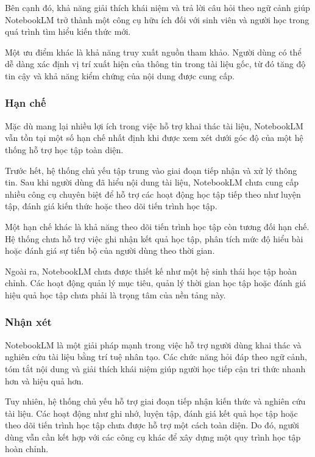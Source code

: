 Bên cạnh đó, khả năng giải thích khái niệm và trả lời câu hỏi theo ngữ cảnh giúp NotebookLM trở thành một công cụ hữu ích đối với sinh viên và người học trong quá trình tìm hiểu kiến thức mới.

Một ưu điểm khác là khả năng truy xuất nguồn tham khảo. Người dùng có thể dễ dàng xác định vị trí xuất hiện của thông tin trong tài liệu gốc, từ đó tăng độ tin cậy và khả năng kiểm chứng của nội dung được cung cấp.

\subsubsection{Hạn chế}

Mặc dù mang lại nhiều lợi ích trong việc hỗ trợ khai thác tài liệu, NotebookLM vẫn tồn tại một số hạn chế nhất định khi được xem xét dưới góc độ của một hệ thống hỗ trợ học tập toàn diện.

Trước hết, hệ thống chủ yếu tập trung vào giai đoạn tiếp nhận và xử lý thông tin. Sau khi người dùng đã hiểu nội dung tài liệu, NotebookLM chưa cung cấp nhiều công cụ chuyên biệt để hỗ trợ các hoạt động học tập tiếp theo như luyện tập, đánh giá kiến thức hoặc theo dõi tiến trình học tập.

Một hạn chế khác là khả năng theo dõi tiến trình học tập còn tương đối hạn chế. Hệ thống chưa hỗ trợ việc ghi nhận kết quả học tập, phân tích mức độ hiểu bài hoặc đánh giá sự tiến bộ của người dùng theo thời gian.

Ngoài ra, NotebookLM chưa được thiết kế như một hệ sinh thái học tập hoàn chỉnh. Các hoạt động quản lý mục tiêu, quản lý thời gian học tập hoặc đánh giá hiệu quả học tập chưa phải là trọng tâm của nền tảng này.

\subsubsection{Nhận xét}

NotebookLM là một giải pháp mạnh trong việc hỗ trợ người dùng khai thác và nghiên cứu tài liệu bằng trí tuệ nhân tạo. Các chức năng hỏi đáp theo ngữ cảnh, tóm tắt nội dung và giải thích khái niệm giúp người học tiếp cận tri thức nhanh hơn và hiệu quả hơn.

Tuy nhiên, hệ thống chủ yếu hỗ trợ giai đoạn tiếp nhận kiến thức và nghiên cứu tài liệu. Các hoạt động như ghi nhớ, luyện tập, đánh giá kết quả học tập hoặc theo dõi tiến trình học tập chưa được hỗ trợ một cách toàn diện. Do đó, người dùng vẫn cần kết hợp với các công cụ khác để xây dựng một quy trình học tập hoàn chỉnh.


